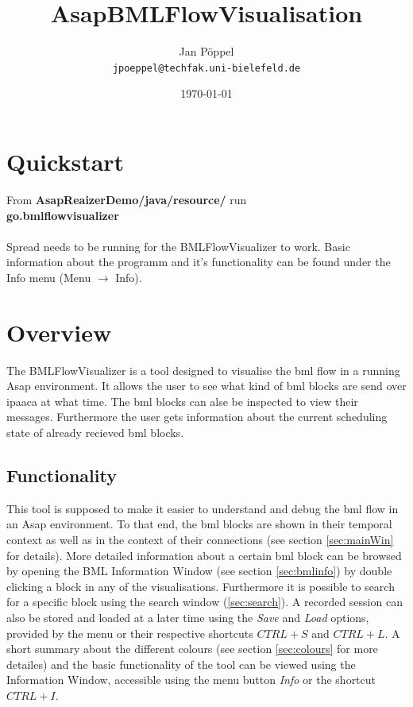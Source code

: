 \documentclass[12pt,a4paper]{article}
\begin{document}
\title{\bf{AsapBMLFlowVisualisation}}
\date{\today}
\author{Jan Pöppel \\[3mm]
{\tt jpoeppel@techfak.uni-bielefeld.de}}
\maketitle\thispagestyle{empty}

\section*{Quickstart}

From \textbf{AsapReaizerDemo/java/resource/} run \\
\textbf{go.bmlflowvisualizer} 
~\\~\\
Spread needs to be running for the BMLFlowVisualizer to work.
Basic information about the programm and it's functionality can be found under the 
Info menu (Menu $\rightarrow$ Info).

\tableofcontents

\section{Overview}

The BMLFlowVisualizer is a tool designed to visualise the bml flow in a running Asap environment. It allows the user to see what kind of bml blocks are send over 
ipaaca at what time. The bml blocks can alse be inspected to view their messages. 
Furthermore the user gets information about the current scheduling state of already recieved bml blocks. 

\subsection{Functionality}

This tool is supposed to make it easier to understand and debug the bml flow in an Asap environment. To that end, the bml blocks are shown in their temporal context as well
as in the context of their connections (see section \ref{sec:mainWin} for details). More detailed information about a certain bml block can be browsed by opening
the BML Information Window (see section \ref{sec:bmlinfo}) by double clicking a block in any of the visualisations. Furthermore it is possible to search for a specific
block using the search window (\ref{sec:search}). A recorded session can also be stored and loaded at a later time using the \textit{Save} and \textit{Load} options, 
provided by the menu or their respective shortcuts $CTRL+S$ and $CTRL+L$. A short summary about the different colours (see section \ref{sec:colours} for more detailes) 
and the basic functionality of the tool can be viewed using the Information Window, accessible using the menu button \textit{Info} or the shortcut $CTRL+I$.
\end{document}
